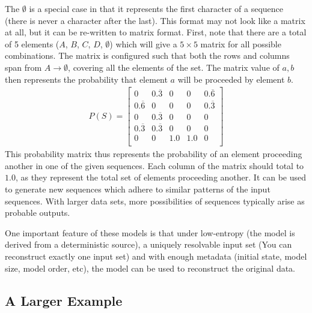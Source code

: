 The $\emptyset$ is a special case in that it represents the first character of a sequence (there is never a character after the last). This format may not look like a matrix at all, but it can be re-written to matrix format. First, note that there are a total of 5 elements ($A$, $B$, $C$, $D$, $\emptyset$) which will give a $5 \times 5$ matrix for all possible combinations. The matrix is configured such that both the rows and columns span from $A\rightarrow\emptyset$, covering all the elements of the set. The matrix value of $a, b$ then represents the probability that element $a$ will be proceeded by element $b$.
\begin{align}
P(S) = \left[
\begin{matrix}
0 & 0.\overline{3} & 0 & 0 & 0.\overline{6} \\ 
0.\overline{6} & 0 & 0 & 0 & 0.\overline{3} \\ 
0 & 0.\overline{3} & 0 & 0 & 0 \\ 
0.\overline{3} & 0.\overline{3} & 0 & 0 & 0\\ 
0 & 0 & 1.0 & 1.0 & 0 \\ 
\end{matrix}\right] \label{eqn:Example-prob-matrix-1}
\end{align}
This probability matrix thus represents the probability of an element proceeding another in one of the given sequences. Each column of the matrix should total to $1.0$, as they represent the total set of elements proceeding another. It can be used to generate new sequences which adhere to similar patterns of the input sequences. With larger data sets, more possibilities of sequences typically arise as probable outputs. 

One important feature of these models is that under low-entropy (the model is derived from a deterministic source), a uniquely resolvable input set (You can reconstruct exactly one input set) and with enough metadata (initial state, model size, model order, etc), the model can be used to reconstruct the original data.







\subsection{A Larger Example}

